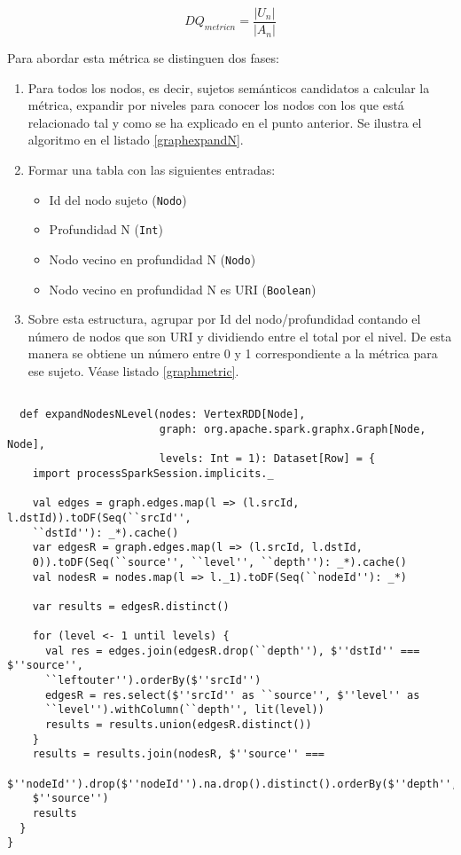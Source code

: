 \begin{equation}
  DQ_{metricn} = \frac{|U_n|}{|A_n|}
  \label{eq:metricI3}
\end{equation}

Para abordar esta métrica se distinguen dos fases: 

\begin{enumerate}
\item Para todos los nodos, es decir, sujetos semánticos candidatos a calcular
  la métrica, expandir por niveles para conocer los nodos con los que está
  relacionado tal y como se ha explicado en el punto anterior. Se ilustra el
  algoritmo en el listado \ref{graphexpandN}. 

\item Formar una tabla con las siguientes entradas: 
  \begin{itemize}
  \item Id del nodo sujeto (\texttt{Nodo})
  \item Profundidad N (\texttt{Int})
  \item Nodo vecino en profundidad N (\texttt{Nodo})
  \item Nodo vecino en profundidad N es URI (\texttt{Boolean})
  \end{itemize}
\item Sobre esta estructura, agrupar por Id del nodo/profundidad contando el
  número de nodos que son URI y dividiendo entre el total por el nivel. De esta
  manera se obtiene un número entre 0 y 1 correspondiente a la métrica para ese
  sujeto. Véase listado \ref{graphmetric}.
\end{enumerate}

\lstset{escapechar=@,language=scala}
\begin{lstlisting}[caption={Expansión de nodos en N niveles para un conjunto de
      sujetos},captionpos=b, label=graphexpandN]

  def expandNodesNLevel(nodes: VertexRDD[Node],
                        graph: org.apache.spark.graphx.Graph[Node, Node],
                        levels: Int = 1): Dataset[Row] = {
    import processSparkSession.implicits._

    val edges = graph.edges.map(l => (l.srcId, l.dstId)).toDF(Seq(``srcId'',
    ``dstId''): _*).cache()
    var edgesR = graph.edges.map(l => (l.srcId, l.dstId,
    0)).toDF(Seq(``source'', ``level'', ``depth''): _*).cache()
    val nodesR = nodes.map(l => l._1).toDF(Seq(``nodeId''): _*)

    var results = edgesR.distinct()

    for (level <- 1 until levels) {
      val res = edges.join(edgesR.drop(``depth''), $''dstId'' === $''source'',
      ``leftouter'').orderBy($''srcId'')
      edgesR = res.select($''srcId'' as ``source'', $''level'' as
      ``level'').withColumn(``depth'', lit(level))
      results = results.union(edgesR.distinct())
    }
    results = results.join(nodesR, $''source'' ===
    $''nodeId'').drop($''nodeId'').na.drop().distinct().orderBy($''depth'',
    $''source'')
    results
  }
}

\end{lstlisting}

